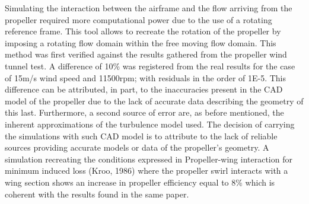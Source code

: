 \documentclass[../../main.tex]{subfiles}
\begin{document}
Simulating the interaction between the airframe and the flow arriving from the propeller required more computational power due to the use of a rotating reference frame.
This tool allows to recreate the rotation of the propeller by imposing a rotating flow domain within the free moving flow domain.
This method was first verified against the results gathered from the propeller wind tunnel test.
A difference of 10\% was registered from the real results for the case of 15m/s wind speed and 11500rpm; with residuals in the order of 1E-5.
This difference can be attributed, in part, to the inaccuracies present in the CAD model of the propeller due to the lack of accurate data describing the geometry of this last.
Furthermore, a second source of error are, as before mentioned, the inherent approximations of the turbulence model used.
The decision of carrying the simulations with such CAD model is to attribute to the lack of reliable sources providing accurate models or data of the propeller’s geometry.
A simulation recreating the conditions expressed in Propeller-wing interaction for minimum induced loss (Kroo, 1986) where the propeller swirl interacts with a wing section shows an increase in propeller efficiency equal to 8\% which is coherent with the results found in the same paper.

\end{document}
